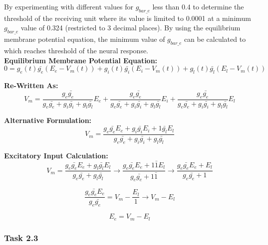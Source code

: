 By experimenting with different values for $g_{bar\_e}$ less than 0.4 to determine the threshold of the receiving unit where its value is limited to 0.0001 at a minimum $g_{bar\_e}$ value of 0.324 (restricted to 3 decimal places). By using the equilibrium membrane potential equation, the minimum value of $g_{bar\_e}$ can be calculated to which reaches threshold of the neural response. \\

\textbf{Equilibrium Membrane Potential Equation:}
\begin{equation}
0 = g_e(t) \bar{g_e} (E_e - V_m(t))+ g_i(t) \bar{g_i} (E_i - V_m(t)) + g_l(t) \bar{g_l} (E_l - V_m(t))
\label{Equil Memb Pot Eq}
\end{equation}

\textbf{Re-Written As:}
\begin{equation}
V_m = \dfrac{g_e \bar{g_e}}{g_e \bar{g_e} + g_i \bar{g_i} + g_l \bar{g_l}} E_e + \dfrac{g_e \bar{g_e}}{g_e \bar{g_e} + g_i \bar{g_i} + g_l \bar{g_l}} E_i + \dfrac{g_e \bar{g_e}}{g_e \bar{g_e} + g_i \bar{g_i} + g_l \bar{g_l}} E_l
\label{New Equil Memb Pot Eq}
\end{equation}

\textbf{Alternative Formulation:}
\begin{equation}
V_m = \dfrac{g_e \bar{g_e} E_e + g_i \bar{g_i} E_i + 1 \bar{g_l} E_l}{g_e \bar{g_e} + g_i \bar{g_i} + g_l \bar{g_l}}
\label{Alt Equil Memb Pot Eq}
\end{equation}

\textbf{Excitatory Input Calculation:}
\begin{equation}
V_m = \dfrac{g_e \bar{g_e} E_e + g_l \bar{g_l} E_l}{g_e \bar{g_e} + g_l \bar{g_l}} \rightarrow \dfrac{g_e \bar{g_e} E_e + 1 \bar{1} E_l}{g_e \bar{g_e} + 1 \bar{1}} \rightarrow \dfrac{g_e \bar{g_e} E_e + E_l}{g_e \bar{g_e} + 1} 
\label{Q2.2 Calculation}
\end{equation}

\begin{equation}
\dfrac{g_e \bar{g_e} E_e}{g_e \bar{g_e}} = V_m - \dfrac{E_l}{1} \rightarrow V_m - E_l
\label{Q2.21 Calculation}
\end{equation}

\begin{equation}
E_e = V_m - E_l
\label{Q2.22 Calculation}
\end{equation}

\subsubsection{Task 2.3}
\label{Q1:Expl 2.6.1(2.3) SubSubSection}

